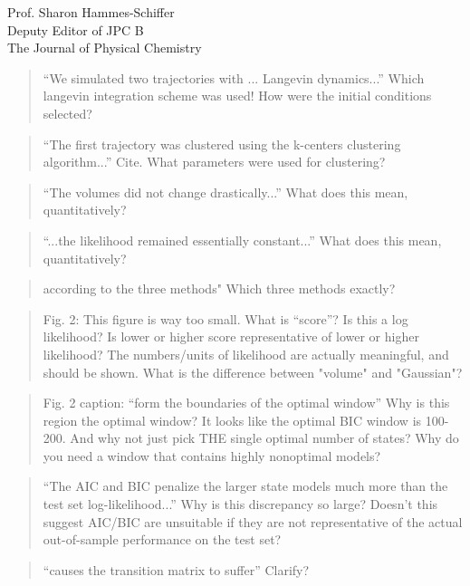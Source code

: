 \documentclass{letter}
\begin{document}
\begin{letter}{Prof. Sharon Hammes-Schiffer \\ Deputy Editor of JPC B \\ The Journal of Physical Chemistry}
\begin{quote}
``We simulated two trajectories with ... Langevin dynamics...''  Which langevin integration scheme was used!  How were the initial conditions selected?
\end{quote}

\begin{quote}
``The first trajectory was clustered using the k-centers clustering algorithm...'' Cite.  What parameters were used for clustering?
\end{quote}

\begin{quote}
``The volumes did not change drastically...'' What does this mean, quantitatively?
\end{quote}

\begin{quote}
``...the likelihood remained essentially constant...'' What does this mean, quantitatively?
\end{quote}

\begin{quote}
according to the three methods" Which three methods exactly?
\end{quote}

\begin{quote}
Fig. 2: This figure is way too small.  What is ``score''?  Is this a log likelihood?  Is lower or higher score representative of lower or higher likelihood?  The numbers/units of likelihood are actually meaningful, and should be shown.  What is the difference between "volume" and "Gaussian"?
\end{quote}

\begin{quote}
Fig. 2 caption: ``form the boundaries of the optimal window''  Why is this region the optimal window?  It looks like the optimal BIC window is 100-200.  And why not just pick THE single optimal number of states?  Why do you need a window that contains highly nonoptimal models?
\end{quote}

\begin{quote}
``The AIC and BIC penalize the larger state models much more than the test set log-likelihood...''  Why is this discrepancy so large?  Doesn't this suggest AIC/BIC are unsuitable if they are not representative of the actual out-of-sample performance on the test set?
\end{quote}

\begin{quote}
``causes the transition matrix to suffer''  Clarify?
\end{quote}


\end{letter}
\end{document}
